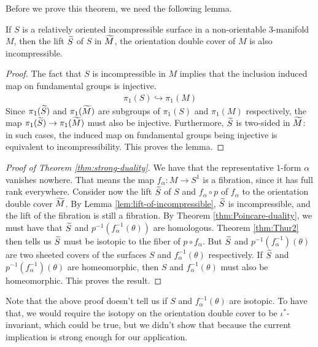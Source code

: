 Before we prove this theorem, we need the following lemma.
\begin{lem}
  \label{lem:lift-of-incompressible}
  If $S$ is a relatively oriented incompressible surface in a non-orientable $3$-manifold $M$, then the lift $\widetilde{S}$ of $S$ in $\widetilde{M}$, the orientation double cover of $M$ is also incompressible.
\end{lem}
\begin{proof}
  The fact that $S$ is incompressible in $M$ implies that the inclusion induced map on fundamental groups is injective.
  \begin{align*}
    \pi_1(S) \hookrightarrow \pi_1(M)
  \end{align*}
  Since $\pi_1(\widetilde{S})$ and $\pi_1(\widetilde{M})$ are subgroups of $\pi_1(S)$ and $\pi_1(M)$ respectively, the map $\pi_1(\widetilde{S}) \to \pi_1(\widetilde{M})$ must also be injective.
  Furthermore, $\widetilde{S}$ is two-sided in $\widetilde{M}$: in such cases, the induced map on fundamental groups being injective is equivalent to incompressibility.
  This proves the lemma.
\end{proof}

\begin{proof}[Proof of Theorem \ref{thm:strong-duality}]
  We have that the representative $1$-form $\alpha$ vanishes nowhere.
  That means the map $f_{\alpha}: M \to S^1$ is a fibration, since it has full rank everywhere.
  Consider now the lift $\widetilde{S}$ of $S$ and $f_{\alpha} \circ p$ of $f_{\alpha}$ to the orientation double cover $\widetilde{M}$.
  By Lemma \ref{lem:lift-of-incompressible}, $\widetilde{S}$ is incompressible, and the lift of the fibration is still a fibration.
  By Theorem \ref{thm:Poincare-duality}, we must have that $\widetilde{S}$ and $p^{-1}(f_{\alpha}^{-1}(\theta))$ are homologous.
  Theorem \ref{thm:Thur2} then tells us $\widetilde{S}$ must be isotopic to the fiber of $p \circ f_{\alpha}$.
  But $\widetilde{S}$ and $p^{-1}(f_{\alpha}^{-1})(\theta)$ are two sheeted covers of the surfaces $S$ and $f_{\alpha}^{-1}(\theta)$ respectively.
  If $\widetilde{S}$ and $p^{-1}(f_{\alpha}^{-1})(\theta)$ are homeomorphic, then $S$ and $f_{\alpha}^{-1}(\theta)$ must also be homeomorphic.
  This proves the result.
\end{proof}

\begin{rem}
  Note that the above proof doesn't tell us if $S$ and $f_{\alpha}^{-1}(\theta)$ are isotopic.
  To have that, we would require the isotopy on the orientation double cover to be $\iota^{\ast}$-invariant, which could be true, but we didn't show that because the current implication is strong enough for our application.
\end{rem}

